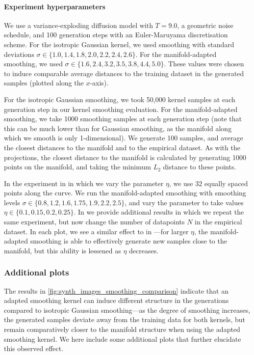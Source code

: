 \documentclass[10pt]{article}
\theoremstyle{plain}
\theoremstyle{definition}
\theoremstyle{remark}
\begin{document}
\paragraph{Experiment hyperparameters} 
We use a variance-exploding diffusion model with $T=9.0$, a geometric noise schedule, and 100 generation steps with an Euler-Maruyama discretisation scheme. For the isotropic Gaussian kernel, we used smoothing with standard deviations $\sigma \in \{1.0, 1.4, 1.8, 2.0, 2.2, 2.4, 2.6\}$. For the manifold-adapted smoothing, we used $\sigma \in \{1.6, 2.4, 3.2, 3.5, 3.8, 4.4, 5.0\}$. These values were chosen to induce comparable average distances to the training dataset in the generated samples (plotted along the $x$-axis).

For the isotropic Gaussian smoothing, we took 50,000 kernel samples at each generation step in our kernel smoothing evaluation. For the manifold-adapted smoothing, we take 1000 smoothing samples at each generation step (note that this can be much lower than for Gaussian smoothing, as the manifold along which we smooth is only 1-dimensional). We generate 100 samples, and average the closest distances to the manifold and to the empirical dataset. As with the projections, the closest distance to the manifold is calculated by generating 1000 points on the manifold, and taking the minimum $L_2$ distance to these points.

In the experiment in  in which we vary the parameter $\eta$, we use 32 equally spaced points along the curve. We run the manifold-adapted smoothing with smoothing levels $\sigma \in \{0.8, 1.2, 1.6, 1.75, 1.9, 2.2, 2.5\}$, and vary the parameter to take values $\eta \in \{0.1, 0.15, 0.2, 0.25\}$. In  we provide additional results in which we repeat the same experiment, but now change the number of datapoints $N$ in the empirical dataset. In each plot, we see a similar effect to in —for larger $\eta$, the manifold-adapted smoothing is able to effectively generate new samples close to the manifold, but this ability is lessened as $\eta$ decreases.

\subsubsection{Additional plots}

The results in \cref{fig:synth_images_smoothing_comparison} indicate that an adapted smoothing kernel can induce different structure in the generations compared to isotropic Gaussian smoothing—as the degree of smoothing increases, the generated samples deviate away from the training data for both kernels, but remain comparatively closer to the manifold structure when using the adapted smoothing kernel. We here include some additional plots that further elucidate this observed effect.
\end{document}

